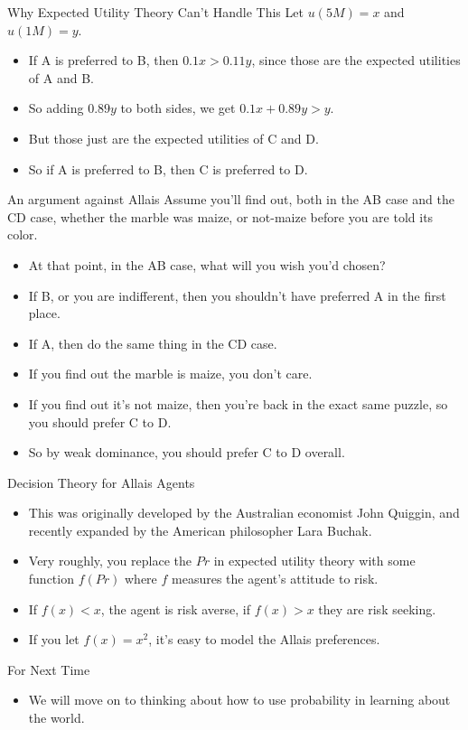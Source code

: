 \documentclass[
  ignorenonframetext,
]{beamer}
\providecommand{\tightlist}{%
  \setlength{\itemsep}{0pt}\setlength{\parskip}{0pt}}
\renewcommand{\,}{\text{, }}
\begin{document}
\begin{frame}{Why Expected Utility Theory Can't Handle This}
\protect\hypertarget{why-expected-utility-theory-cant-handle-this}{}
Let \(u(5M) = x\) and \(u(1M) = y\).

\begin{itemize}
\tightlist
\item
  If A is preferred to B, then \(0.1x > 0.11y\), since those are the
  expected utilities of A and B. \pause
\item
  So adding \(0.89y\) to both sides, we get \(0.1x + 0.89y > y\). \pause
\item
  But those just are the expected utilities of C and D.
\item
  So if A is preferred to B, then C is preferred to D.
\end{itemize}
\end{frame}

\begin{frame}{An argument against Allais}
\protect\hypertarget{an-argument-against-allais}{}
Assume you'll find out, both in the AB case and the CD case, whether the
marble was maize, or not-maize before you are told its color.

\begin{itemize}
\tightlist
\item
  At that point, in the AB case, what will you wish you'd chosen? \pause
\item
  If B, or you are indifferent, then you shouldn't have preferred A in
  the first place. \pause
\item
  If A, then do the same thing in the CD case.
\item
  If you find out the marble is maize, you don't care.
\item
  If you find out it's not maize, then you're back in the exact same
  puzzle, so you should prefer C to D.
\item
  So by weak dominance, you should prefer C to D overall.
\end{itemize}
\end{frame}

\begin{frame}{Decision Theory for Allais Agents}
\protect\hypertarget{decision-theory-for-allais-agents}{}
\begin{itemize}
\tightlist
\item
  This was originally developed by the Australian economist John
  Quiggin, and recently expanded by the American philosopher Lara
  Buchak.
\item
  Very roughly, you replace the \(Pr\) in expected utility theory with
  some function \(f(Pr)\) where \(f\) measures the agent's attitude to
  risk.
\item
  If \(f(x) < x\), the agent is risk averse, if \(f(x) > x\) they are
  risk seeking.
\item
  If you let \(f(x) = x^2\), it's easy to model the Allais preferences.
\end{itemize}
\end{frame}

\begin{frame}{For Next Time}
\protect\hypertarget{for-next-time}{}
\begin{itemize}
\tightlist
\item
  We will move on to thinking about how to use probability in learning
  about the world.
\end{itemize}
\end{frame}
\end{document}
